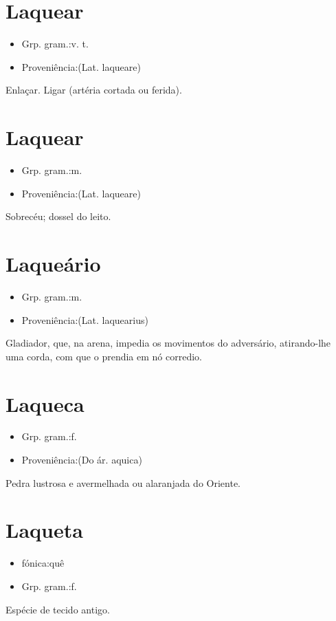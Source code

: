 \section{Laquear}
\begin{itemize}
\item {Grp. gram.:v. t.}
\end{itemize}
\begin{itemize}
\item {Proveniência:(Lat. \textunderscore laqueare\textunderscore )}
\end{itemize}
Enlaçar.
Ligar (artéria cortada ou ferida).
\section{Laquear}
\begin{itemize}
\item {Grp. gram.:m.}
\end{itemize}
\begin{itemize}
\item {Proveniência:(Lat. \textunderscore laqueare\textunderscore )}
\end{itemize}
Sobrecéu; dossel do leito.
\section{Laqueário}
\begin{itemize}
\item {Grp. gram.:m.}
\end{itemize}
\begin{itemize}
\item {Proveniência:(Lat. \textunderscore laquearius\textunderscore )}
\end{itemize}
Gladiador, que, na arena, impedia os movimentos do adversário, atirando-lhe uma corda, com que o prendia em nó corredio.
\section{Laqueca}
\begin{itemize}
\item {Grp. gram.:f.}
\end{itemize}
\begin{itemize}
\item {Proveniência:(Do ár. \textunderscore aquica\textunderscore )}
\end{itemize}
Pedra lustrosa e avermelhada ou alaranjada do Oriente.
\section{Laqueta}
\begin{itemize}
\item {fónica:quê}
\end{itemize}
\begin{itemize}
\item {Grp. gram.:f.}
\end{itemize}
Espécie de tecido antigo.
